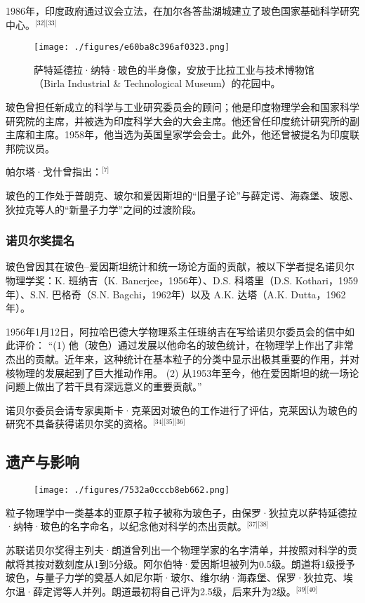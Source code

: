 1986年，印度政府通过议会立法，在加尔各答盐湖城建立了玻色国家基础科学研究中心。\(^\text{[32][33]}\)
\begin{figure}[ht]
\centering
\texttt{[image: ./figures/e60ba8c396af0323.png]}
\caption{萨特延德拉·纳特·玻色的半身像，安放于比拉工业与技术博物馆（Birla Industrial & Technological Museum）的花园中。} \label{fig_BOSE_6}
\end{figure}
玻色曾担任新成立的科学与工业研究委员会的顾问；他是印度物理学会和国家科学研究院的主席，并被选为印度科学大会的大会主席。他还曾任印度统计研究所的副主席和主席。1958年，他当选为英国皇家学会会士。此外，他还曾被提名为印度联邦院议员。

帕尔塔·戈什曾指出：\(^\text{[7]}\)

玻色的工作处于普朗克、玻尔和爱因斯坦的“旧量子论”与薛定谔、海森堡、玻恩、狄拉克等人的“新量子力学”之间的过渡阶段。
\subsubsection{诺贝尔奖提名}
玻色曾因其在玻色–爱因斯坦统计和统一场论方面的贡献，被以下学者提名诺贝尔物理学奖：K. 班纳吉（K. Banerjee，1956年）、D.S. 科塔里（D.S. Kothari，1959年）、S.N. 巴格奇（S.N. Bagchi，1962年）以及 A.K. 达塔（A.K. Dutta，1962年）。

1956年1月12日，阿拉哈巴德大学物理系主任班纳吉在写给诺贝尔委员会的信中如此评价：
“(1) 他（玻色）通过发展以他命名的玻色统计，在物理学上作出了非常杰出的贡献。近年来，这种统计在基本粒子的分类中显示出极其重要的作用，并对核物理的发展起到了巨大推动作用。
(2) 从1953年至今，他在爱因斯坦的统一场论问题上做出了若干具有深远意义的重要贡献。”

诺贝尔委员会请专家奥斯卡·克莱因对玻色的工作进行了评估，克莱因认为玻色的研究不具备获得诺贝尔奖的资格。\(^\text{[34][35][36]}\)
\subsection{遗产与影响}
\begin{figure}[ht]
\centering
\texttt{[image: ./figures/7532a0cccb8eb662.png]}
\caption{} \label{fig_BOSE_7}
\end{figure}
粒子物理学中一类基本的亚原子粒子被称为玻色子，由保罗·狄拉克以萨特延德拉·纳特·玻色的名字命名，以纪念他对科学的杰出贡献。\(^\text{[37][38]}\)

苏联诺贝尔奖得主列夫·朗道曾列出一个物理学家的名字清单，并按照对科学的贡献将其按对数刻度从1到5分级。阿尔伯特·爱因斯坦被列为0.5级。朗道将1级授予玻色，与量子力学的奠基人如尼尔斯·玻尔、维尔纳·海森堡、保罗·狄拉克、埃尔温·薛定谔等人并列。朗道最初将自己评为2.5级，后来升为2级。\(^\text{[39][40]}\)

